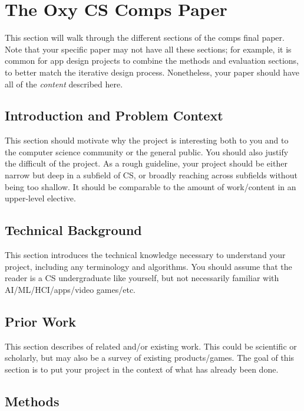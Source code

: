 \documentclass[10pt,twocolumn]{article}
\begin{document}
\section{The Oxy CS Comps Paper}
\label{sec:paper}

This section will walk through the different sections of the comps final paper.
Note that your specific paper may not have all these sections; for example, it is common for app design projects to combine the methods and evaluation sections, to better match the iterative design process.
Nonetheless, your paper should have all of the \textit{content} described here.

\subsection{Introduction and Problem Context}

This section should motivate why the project is interesting both to you and to the computer science community or the general public.
You should also justify the difficult of the project.
As a rough guideline, your project should be either narrow but deep in a subfield of CS, or broadly reaching across subfields without being too shallow.
It should be comparable to the amount of work/content in an upper-level elective.

\subsection{Technical Background}

This section introduces the technical knowledge necessary to understand your project, including any terminology and algorithms.
You should assume that the reader is a CS undergraduate like yourself, but not necessarily familiar with AI/ML/HCI/apps/video games/etc.

\subsection{Prior Work}

This section describes of related and/or existing work.
This could be scientific or scholarly, but may also be a survey of existing products/games.
The goal of this section is to put your project in the context of what has already been done.

\subsection{Methods}
\end{document}
